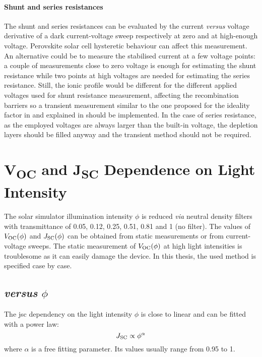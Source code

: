 	\paragraph{Shunt and series resistances} \label{resistances}
	The shunt and series resistances can be evaluated by the current \textsl{versus} voltage derivative of a dark current-voltage sweep respectively at zero and at high-enough voltage.
	Perovskite solar cell hysteretic behaviour can affect this measurement.
	An alternative could be to measure the stabilised current at a few voltage points: a couple of measurements close to zero voltage is enough for estimating the shunt resistance while two points at high voltages are needed for estimating the series resistance.
	Still, the ionic profile would be different for the different applied voltages used for shunt resistance measurement, affecting the recombination barriers \cite{Moia2019,Pockett2017} so a transient measurement similar to the one proposed for the ideality factor in \cite{Calado2018b} and explained in  should be implemented.
	In the case of series resistance, as the employed voltages are always larger than the built-in voltage, the depletion layers should be filled anyway and the transient method should not be required.

\section{V\textsubscript{OC} and J\textsubscript{SC} Dependence on Light Intensity}
	The solar simulator illumination intensity $\phi$ is reduced \textsl{via} neutral density filters with transmittance of 0.05, 0.12, 0.25, 0.51, 0.81 and 1 (no filter).
	The values of $V_\mathrm{OC}(\phi)$ and $J_\mathrm{SC}(\phi)$ can be obtained from static measurements or from current-voltage sweeps.
	The static measurement of $V_\mathrm{OC}(\phi)$ at high light intensities is troublesome as it can easily damage the device.
	In this thesis, the used method is specified case by case.

	\subsection{ \textsl{versus} $\phi$}\label{jsc-phi}
		The \gls{jsc} dependency on the light intensity $\phi$ is close to linear and can be fitted with a power law:
		\begin{equation} \label{eq:jsc-phi}
			J_\mathrm{SC} \propto \phi^\alpha
		\end{equation}
		where $\alpha$ is a free fitting parameter. Its values usually range from 0.95 to 1.

